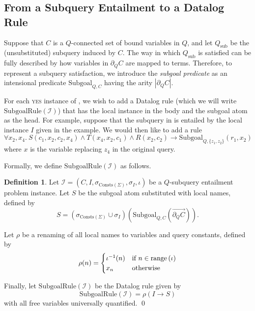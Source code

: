 \documentclass[12pt]{report}
\theoremstyle{plain}
\theoremstyle{definition}
\newtheorem{definition}[theorem]{Definition}
\def\Consts{{\mathrm{Consts}}}
\newcommand{\range}[1]{\ensuremath{\normalfont{\operatorname{range}} \left( #1 \right)}}
\begin{document}
\subsection{From a Subquery Entailment to a Datalog Rule}

Suppose that $C$ is a $Q$-connected set of bound variables in $Q$, and let $Q_\mathrm{sub}$ be the (unsubstituted) subquery induced by $C$. The way in which $Q_\mathrm{sub}$ is satisfied can be fully described by how variables in $\partial_Q C$ are mapped to terms. Therefore, to represent a subquery satisfaction, we introduce the \emph{subgoal predicate} as an intensional predicate $\mathrm{Subgoal}_{Q, C}$ having the arity $|\partial_Q C|$.

For each \textsc{yes} instance of , we wish to add a Datalog rule (which we will write $\mathrm{SubgoalRule}(\mathcal{I})$) that has the local instance in the body and the subgoal atom as the head.
For example, suppose that the subquery in  is entailed by the local instance $I$ given in the example. We would then like to add a rule $$
  \forall x_2, x_4.\ S(c_1, x_2, c_2, x_4) \wedge T(x_4, x_2, c_1) \wedge R(x_2, c_2) \rightarrow \mathrm{Subgoal}_{Q, \{z_1, z_2\}}(r_1, x_2)
$$
where $x$ is the variable replacing $z_4$ in the original query.

Formally, we define $\mathrm{SubgoalRule}(\mathcal{I})$ as follows.

\begin{definition}
  Let $\mathcal{I} = (C, I, \sigma_{\Consts(\Sigma)}, \sigma_I, \iota)$ be a $Q$-subquery entailment problem instance. Let $S$ be the subgoal atom substituted with local names, defined by $$
    S = (\sigma_{\Consts(\Sigma)} \cup \sigma_I)\left(\mathrm{Subgoal}_{Q, C}\left(\overrightarrow{\partial_Q C}\right)\right).
  $$

  Let $\rho$ be a renaming of all local names to variables and query constants, defined by $$
    \rho(n) = \begin{cases}
      \iota^{-1}(n) & \text{if } n \in \range{\iota} \\
      x_n & \text{otherwise}
    \end{cases}
  $$

  Finally, let $\mathrm{SubgoalRule}(\mathcal{I})$ be the Datalog rule given by $$
    \mathrm{SubgoalRule}(\mathcal{I}) = \rho\left(I \rightarrow S\right)
  $$ with all free variables universally quantified.
  \qed
\end{definition}
\end{document}
